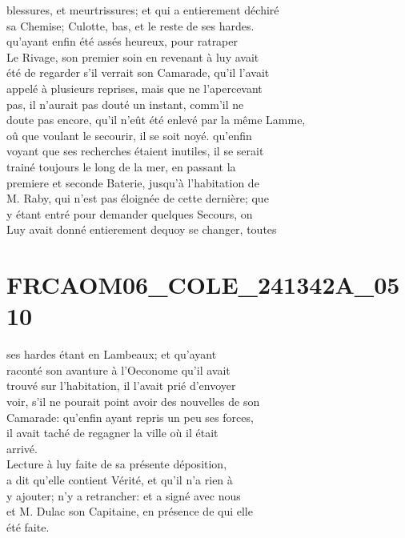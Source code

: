 \documentclass{article}
\begin{document}
\begin{pages}
blessures, et meurtrissures; et qui a entierement déchiré\\
sa Chemise; Culotte, bas, et le reste de ses hardes.\\
qu'ayant enfin été assés heureux, pour ratraper\\
Le Rivage, son premier soin en revenant à luy avait\\
été de regarder s'il verrait son Camarade, qu'il l'avait\\
appelé à plusieurs reprises, mais que ne l'apercevant\\
pas, il n'aurait pas douté un instant, comm'il ne\\
doute pas encore, qu'il n'eût été enlevé par la même Lamme,\\
oû que voulant le secourir, il se soit noyé. qu'enfin\\
voyant que ses recherches étaient inutiles, il se serait\\
trainé toujours le long de la mer, en passant la\\
premiere et seconde Baterie, jusqu'à l'habitation de\\
M. Raby, qui n'est pas éloignée de cette dernière; que\\
y étant entré pour demander quelques Secours, on\\
Luy avait donné entierement dequoy se changer, toutes
\pend
\endnumbering\beginnumbering\section{FRCAOM06\_COLE\_241342A\_0510}\pstart
ses hardes étant en Lambeaux; et qu'ayant\\
raconté son avanture à l'Oeconome qu'il avait\\
trouvé sur l'habitation, il l'avait prié d'envoyer\\
voir, s'il ne pourait point avoir des nouvelles de son\\
Camarade: qu'enfin ayant repris un peu ses forces,\\
il avait taché de regagner la ville où il était\\
arrivé.\\
Lecture à luy faite de sa présente déposition,\\
a dit qu'elle contient Vérité, et qu'il n'a rien à\\
y ajouter; n'y a retrancher: et a signé avec nous\\
et M. Dulac son Capitaine, en présence de qui elle\\
été faite.\\

\end{pages}
\end{document}
